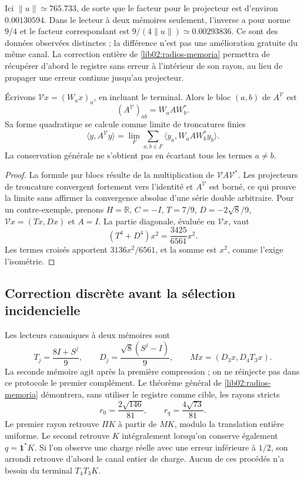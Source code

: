 Ici \(\|u\|\simeq765.733\), de sorte que le facteur pour le projecteur
est d’environ \(0.00130594\). Dans le lecteur à deux mémoires seulement,
l’inverse a pour norme \(9/4\) et le facteur correspondant est
\(9/(4\|u\|)\simeq0.00293836\). Ce sont des données observées distinctes ;
la différence n’est pas une amélioration gratuite du même canal. La correction
entière de \cref{lib02:radios-memoria} permettra de récupérer d’abord le
registre sans erreur à l’intérieur de son rayon, au lieu de propager une erreur
continue jusqu’au projecteur.

\begin{proposition}
\label{lib01:correlaciones}
Écrivons \(\mathcal Vx=(W_ax)_a\), en incluant le terminal. Alors
le bloc \((a,b)\) de \(A^{\mathcal V}\) est
\[
 (A^{\mathcal V})_{ab}=W_aAW_b^*.
\]
Sa forme quadratique se calcule comme limite de troncatures finies
\[
 \langle y,A^{\mathcal V}y\rangle
 =\lim_F\sum_{a,b\in F}\langle y_a,W_aAW_b^*y_b\rangle.
\]
La conservation générale ne s’obtient pas en écartant tous les termes
\(a\ne b\).
\end{proposition}
\begin{proof}
La formule par blocs résulte de la multiplication de \(\mathcal VA\mathcal V^*\). Les projecteurs de troncature convergent fortement vers l'identité et \(A^{\mathcal V}\) est borné, ce qui prouve la limite sans affirmer la convergence absolue d'une série double arbitraire. Pour un contre-exemple, prenons \(H=\mathbb R\), \(C=-I\), \(T=7/9\), \(D=-2\sqrt8/9\), \(\mathcal Vx=(Tx,Dx)\) et \(A=I\). La partie diagonale, évaluée en \(\mathcal Vx\), vaut
\[
 (T^4+D^4)x^2=\frac{3425}{6561}x^2.
\]
Les termes croisés apportent \(3136x^2/6561\), et la somme est
\(x^2\), comme l’exige l’isométrie.
\end{proof}

\subsection{Correction discrète avant la sélection incidencielle}
\label{lib01:correccion-incidencia}

Les lecteurs canoniques à deux mémoires sont
\[
 T_j=\frac{8I+S^j}{9},\qquad
 D_j=\frac{\sqrt8(S^j-I)}9,\qquad
 Mx=(D_3x,D_4T_3x).
\]
La seconde mémoire agit après la première compression ; on ne réinjecte pas
dans ce protocole le premier complément. Le théorème général de
\cref{lib02:radios-memoria} démontrera, sans utiliser le registre comme
cible, les rayons stricts
\[
 r_0=\frac{2\sqrt{146}}{81},\qquad
 r_q=\frac{4\sqrt{73}}{81}.
\]
Le premier rayon retrouve \(\Pi K\) à partir de \(MK\), modulo la
translation entière uniforme. Le second retrouve \(K\) intégralement lorsqu’on
conserve également \(q=\mathbf1^*K\). Si l’on observe une charge réelle
avec une erreur inférieure à \(1/2\), son arrondi retrouve d’abord le canal entier
de charge. Aucun de ces procédés n’a besoin du terminal
\(T_4T_3K\).

